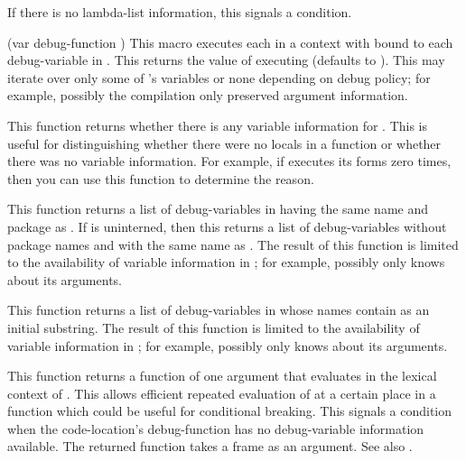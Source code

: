 {If there is no lambda-list information, this signals a
 condition.
\enddefun


  {(var debug-function ) }
This macro executes each  in a context with  bound to each
debug-variable in .  This returns the value of executing
 (defaults to \nil).  This may iterate over only some of 
's variables or none depending on debug policy; for example,
possibly the compilation only preserved argument information.
\enddefmac


This function returns whether there is any variable information for 
.  This is useful for distinguishing whether there were no
locals in a function or whether there was no variable information.  For
example, if  executes its forms zero times,
then you can use this function to determine the reason.
\enddefun


This function returns a list of debug-variables in  having
the same name and package as .  If  is uninterned, then
this returns a list of debug-variables without package names and with the same
name as .  The result of this function is limited to the
availability of variable information in ; for example,
possibly  only knows about its arguments.
\enddefun


This function returns a list of debug-variables in  whose
names contain  as an initial substring.  The result of
this function is limited to the availability of variable information in
; for example, possibly  only knows
about its arguments.
\enddefun


This function returns a function of one argument that evaluates  in
the lexical context of .  This allows efficient
repeated evaluation of  at a certain place in a function which could
be useful for conditional breaking.  This signals a 
condition when the code-location's debug-function has no debug-variable
information available.  The returned function takes a frame as an
argument.  See also .
\enddefun


}

